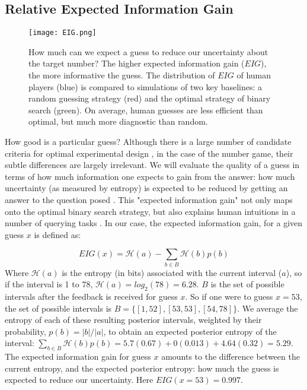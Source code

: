 \documentclass[10pt,letterpaper]{article}
\begin{document}
\subsection{Relative Expected Information Gain}


\begin{figure}[h]
    \texttt{[image: EIG.png]}
    \vspace{-8mm}
    \caption{How much can we expect a guess to reduce our uncertainty about the target number? The higher expected information gain ($EIG$), the more informative the guess. The distribution of $EIG$ of human players (blue) is compared to simulations of two key baselines: a random guessing strategy (red) and the optimal strategy of binary search (green). On average, human guesses are less efficient than optimal, but much more diagnostic than random.
}
    \label{fig:EIG-histogram}
    \vspace{-2mm}
\end{figure}

How good is a particular guess? 
Although there is a large number of candidate criteria for optimal experimental design \cite{NelsonFindingUsefulQuestions2005, coenen2019asking}, in the case of the number game, their subtle differences are largely irrelevant. 
We will evaluate the quality of a guess in terms of how much information one expects to gain from the answer: how much uncertainty (as measured by entropy) is expected to be reduced by getting an answer to the question posed  \cite{ShannonMathematicalTheoryCommunication1948}. 
This "expected information gain" \cite{LindleyMeasureInformationProvided1956,FedorovTheoryoptimalexperiments1972} not only maps onto the optimal binary search strategy, but also explains human intuitions in a number of querying tasks \cite{NelsonFindingUsefulQuestions2005}.\footnotemark
In our case, the expected information gain, for a given guess $x$ is defined as:

\begin{equation}
  EIG(x) = \mathcal{H}(a) - \sum_{b \in B} \mathcal{H}(b) p(b)
\end{equation}
Where $\mathcal{H}(a)$ is the entropy (in bits) associated with the current interval ($a$), so if the interval is 1 to 78, $\mathcal{H}(a) = log_2(78) = 6.28$.
$B$ is the set of possible intervals after the feedback is received for guess $x$. So if one were to guess $x=53$, the set of possible intervals is $B = \{[1, 52], [53,53], [54, 78]\}$. 
We average the entropy of each of these resulting posterior intervals, weighted by their probability, $p(b) = |b|/|a|$, to obtain an expected posterior entropy of the interval: $\sum_{b \in B} \mathcal{H}(b) p(b) = 5.7(0.67) + 0(0.013) + 4.64(0.32) = 5.29$.
The expected information gain for guess $x$ amounts to the difference between the current entropy, and the expected posterior entropy: how much the guess is expected to reduce our uncertainty. Here $EIG(x=53)=0.997$. 
\end{document}
